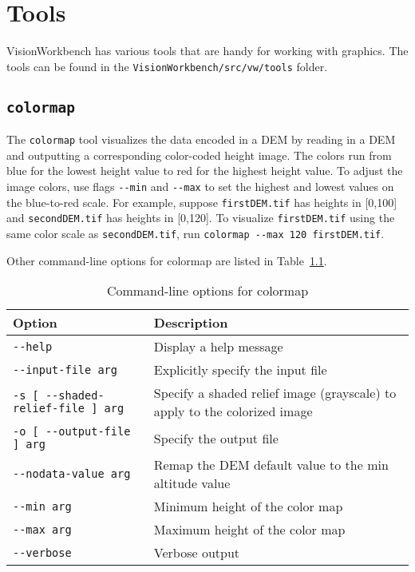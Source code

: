 \chapter{Tools}\label{ch:tools}

VisionWorkbench has various tools that are handy for working with graphics. The tools can be found in the \verb#VisionWorkbench/src/vw/tools# folder.

\section{{\tt colormap}}\label{sec:colormap}

The \verb#colormap# tool visualizes the data encoded in a DEM by reading in a DEM and outputting a corresponding color-coded height image. The colors run from blue for the lowest height value to red for the highest height value.  To adjust the image colors, use flags \verb#--min# and \verb#--max# to set the highest and lowest values on the blue-to-red scale.  For example, suppose \verb#firstDEM.tif# has heights in [0,100] and \verb#secondDEM.tif# has heights in [0,120]. To visualize \verb#firstDEM.tif# using the same color scale as \verb#secondDEM.tif#, run \verb#colormap --max 120 firstDEM.tif#.

Other command-line options for colormap are listed in Table~\ref{tbl:colormap}.

\begin{longtable}{|l|p{10cm}|} 
\caption{Command-line options for colormap}
\label{tbl:colormap}
\endfirsthead
\endhead
\endfoot
\endlastfoot
\hline
Option & Description \\ \hline \hline
\verb#--help# & Display a help message \\ \hline
\verb#--input-file arg# & Explicitly specify the input file \\ \hline
\verb#-s [ --shaded-relief-file ] arg# & Specify a shaded relief image (grayscale) to apply to the colorized image \\ \hline
\verb#-o [ --output-file ] arg# & Specify the output file \\ \hline
\verb#--nodata-value arg# & Remap the DEM default value to the min altitude value \\ \hline
\verb#--min arg# & Minimum height of the color map \\ \hline
\verb#--max arg# & Maximum height of the color map \\ \hline
\verb#--verbose# & Verbose output \\ \hline
\end{longtable}


